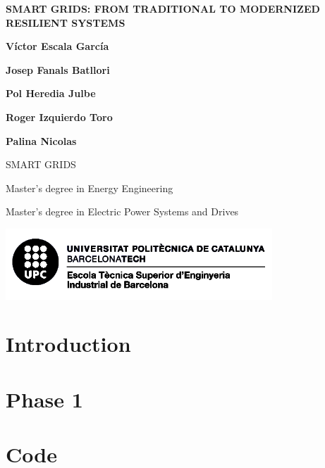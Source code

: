 \documentclass[10pt, a4paper]{report}
\begin{document}
\begin{titlepage}
   \begin{center}
      \vspace*{2em}
      {\Large \bfseries SMART GRIDS: FROM TRADITIONAL TO MODERNIZED RESILIENT SYSTEMS}

       \vspace{6em}

       \textbf{Víctor Escala García}

       \textbf{Josep Fanals Batllori}

       \textbf{Pol Heredia Julbe}

       \textbf{Roger Izquierdo Toro}

       \textbf{Palina Nicolas}

       \vfill

       \vspace{1em}

       SMART GRIDS

       Master's degree in Energy Engineering

       Master's degree in Electric Power Systems and Drives

       \vspace{8em}
     
       \includegraphics[width=10cm]{Data/Logo.png}
            
   \end{center}
\end{titlepage}



\tableofcontents{}


\chapter{Introduction}


\chapter{Phase 1}


\chapter{Code}


\printbibliography
\end{document}
